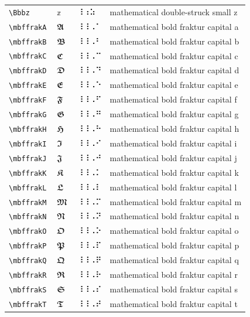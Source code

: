 \documentclass[oneside]{article}
\begin{document}
\begin{longtable}{llll}
\verb|\Bbbz| & $\Bbbz$ &  ⠸⠰⠵  & {mathematical double-struck small z} \\[2ex]
\verb|\mbffrakA| & $\mbffrakA$ &  ⠸⠸⠠⠁  & {mathematical bold fraktur capital a} \\[2ex]
\verb|\mbffrakB| & $\mbffrakB$ &  ⠸⠸⠠⠃  & {mathematical bold fraktur capital b} \\[2ex]
\verb|\mbffrakC| & $\mbffrakC$ &  ⠸⠸⠠⠉  & {mathematical bold fraktur capital c} \\[2ex]
\verb|\mbffrakD| & $\mbffrakD$ &  ⠸⠸⠠⠙  & {mathematical bold fraktur capital d} \\[2ex]
\verb|\mbffrakE| & $\mbffrakE$ &  ⠸⠸⠠⠑  & {mathematical bold fraktur capital e} \\[2ex]
\verb|\mbffrakF| & $\mbffrakF$ &  ⠸⠸⠠⠋  & {mathematical bold fraktur capital f} \\[2ex]
\verb|\mbffrakG| & $\mbffrakG$ &  ⠸⠸⠠⠛  & {mathematical bold fraktur capital g} \\[2ex]
\verb|\mbffrakH| & $\mbffrakH$ &  ⠸⠸⠠⠓  & {mathematical bold fraktur capital h} \\[2ex]
\verb|\mbffrakI| & $\mbffrakI$ &  ⠸⠸⠠⠊  & {mathematical bold fraktur capital i} \\[2ex]
\verb|\mbffrakJ| & $\mbffrakJ$ &  ⠸⠸⠠⠚  & {mathematical bold fraktur capital j} \\[2ex]
\verb|\mbffrakK| & $\mbffrakK$ &  ⠸⠸⠠⠅  & {mathematical bold fraktur capital k} \\[2ex]
\verb|\mbffrakL| & $\mbffrakL$ &  ⠸⠸⠠⠇  & {mathematical bold fraktur capital l} \\[2ex]
\verb|\mbffrakM| & $\mbffrakM$ &  ⠸⠸⠠⠍  & {mathematical bold fraktur capital m} \\[2ex]
\verb|\mbffrakN| & $\mbffrakN$ &  ⠸⠸⠠⠝  & {mathematical bold fraktur capital n} \\[2ex]
\verb|\mbffrakO| & $\mbffrakO$ &  ⠸⠸⠠⠕  & {mathematical bold fraktur capital o} \\[2ex]
\verb|\mbffrakP| & $\mbffrakP$ &  ⠸⠸⠠⠏  & {mathematical bold fraktur capital p} \\[2ex]
\verb|\mbffrakQ| & $\mbffrakQ$ &  ⠸⠸⠠⠟  & {mathematical bold fraktur capital q} \\[2ex]
\verb|\mbffrakR| & $\mbffrakR$ &  ⠸⠸⠠⠗  & {mathematical bold fraktur capital r} \\[2ex]
\verb|\mbffrakS| & $\mbffrakS$ &  ⠸⠸⠠⠎  & {mathematical bold fraktur capital s} \\[2ex]
\verb|\mbffrakT| & $\mbffrakT$ &  ⠸⠸⠠⠞  & {mathematical bold fraktur capital t} \\[2ex]

\end{longtable}
\end{document}

